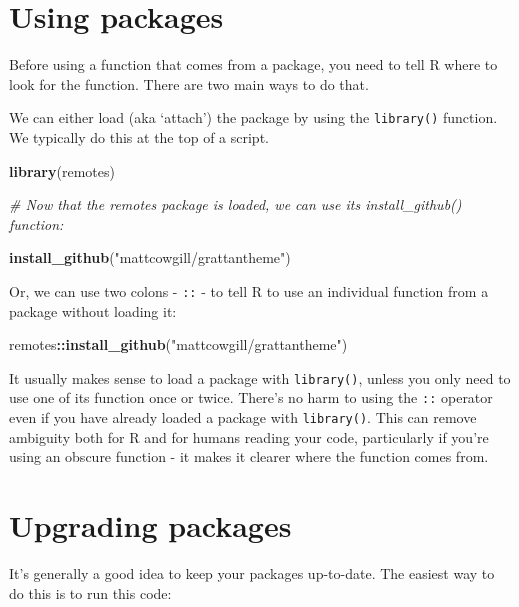 \documentclass[
]{book}
\newenvironment{Shaded}{\begin{snugshade}}{\end{snugshade}}
\newcommand{\CommentTok}[1]{\textcolor[rgb]{0.56,0.35,0.01}{\textit{#1}}}
\newcommand{\KeywordTok}[1]{\textcolor[rgb]{0.13,0.29,0.53}{\textbf{#1}}}
\newcommand{\NormalTok}[1]{#1}
\newcommand{\OperatorTok}[1]{\textcolor[rgb]{0.81,0.36,0.00}{\textbf{#1}}}
\newcommand{\StringTok}[1]{\textcolor[rgb]{0.31,0.60,0.02}{#1}}
\begin{document}
\hypertarget{using-packages}{%
\section{Using packages}\label{using-packages}}

Before using a function that comes from a package, you need to tell R where to look for the function. There are two main ways to do that.

We can either load (aka `attach') the package by using the \texttt{library()} function. We typically do this at the top of a script.

\begin{Shaded}
\begin{Highlighting}[]
\KeywordTok{library}\NormalTok{(remotes)}

\CommentTok{\# Now that the \textasciigrave{}remotes\textasciigrave{} package is loaded, we can use its \textasciigrave{}install\_github()\textasciigrave{} function:}

\KeywordTok{install\_github}\NormalTok{(}\StringTok{"mattcowgill/grattantheme"}\NormalTok{)}
\end{Highlighting}
\end{Shaded}

Or, we can use two colons - \texttt{::} - to tell R to use an individual function from a package without loading it:

\begin{Shaded}
\begin{Highlighting}[]
\NormalTok{remotes}\OperatorTok{::}\KeywordTok{install\_github}\NormalTok{(}\StringTok{"mattcowgill/grattantheme"}\NormalTok{)}
\end{Highlighting}
\end{Shaded}

It usually makes sense to load a package with \texttt{library()}, unless you only need to use one of its function once or twice. There's no harm to using the \texttt{::} operator even if you have already loaded a package with \texttt{library()}. This can remove ambiguity both for R and for humans reading your code, particularly if you're using an obscure function - it makes it clearer where the function comes from.

\hypertarget{upgrading-packages}{%
\section{Upgrading packages}\label{upgrading-packages}}

It's generally a good idea to keep your packages up-to-date. The easiest way to do this is to run this code:
\end{document}
